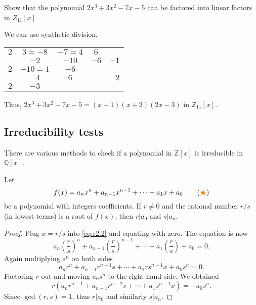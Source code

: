 \begin{example}
    Show that the polynomial $2x^3 + 3x^2 -7x - 5$ can be factored into linear factors in $Z_{11}[x]$.
\end{example}
\begin{solution}
    We can use synthetic division,

    \begin{center}
        \begin{tabular}{cccc|c}
            $2$ & $3 = -8$ & $-7=4$ & $6$ & \\
            & $-2$ & $-10$ & $-6$ & $-1$\\
            \cmidrule{1-4}
            $2$ & $-10 = 1$ & $-6$ & & \\
            & $-4$ & $6$ & & $-2$\\
            \cmidrule{1-4}
            $2$ & $-3$ &  & & \\
        \end{tabular}
    \end{center}

    Thus, $2x^3 + 3x^2 -7x - 5 = (x+1)(x+2)(2x-3)$ in $\mathbb{Z}_{11}[x]$.
\end{solution}

\subsection{Irreducibility tests}

There are various methods to check if a polynomial in $\mathbb{Z}[x]$ is irreducible in $\mathbb{Q}[x]$.

\begin{theorem}
    Let 
    \[ f(x) = a_nx^n + a_{n-1}x^{n-1} + \cdots + a_1x + a_0 \label{eq:r2.2} \tag{{\color{orange} $\bigstar $}} \]
    be a polynomial with integers coefficients. If $r \neq 0$ and 
    the rational number $r/s$ (in lowest terms) is a root of $f(x)$, then 
    $r|a_0$ and $s|a_n$.
\end{theorem}
\begin{proof}
    Plug $x = r/s$ into \eqref{eq:r2.2} and equating with zero. The equation is now 
    \[
        a_n \left( \frac{r}{s}\right)^n + a_{n-1}\left( \frac{r}{s}\right)^{n-1} + \cdots + a_1\left( \frac{r}{s}\right) + a_0
        = 0.
    \]
    Again multiplying $s^n$ on both sides
    \[
        a_nr^n + a_{n-1}r^{n-1}s + \cdots + a_1rs^{n-1}x + a_0s^n = 0.
    \]
    Factoring $r$ out and moving $a_0s^n$ to the right-hand side. We obtained 
    \[
        r(a_nr^{n-1} + a_{n-1}r^{n-2}s + \cdots + a_1s^{n-1}x) = -a_0s^n.
    \]
    Since $\gcd (r,s) = 1$, thus $r|a_0$ and similarly $s|a_n$.
\end{proof}

